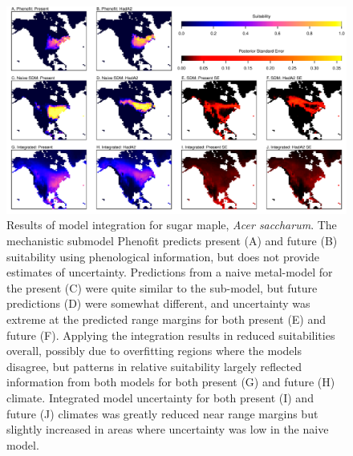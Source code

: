 \begin{figure}[tb]
	\includegraphics[width=6in]{ex2.pdf}
	\caption{Results of model integration for sugar maple, \emph{Acer saccharum}.
	The mechanistic submodel Phenofit predicts present (A) and future (B) suitability using phenological information, but does not provide estimates of uncertainty.
	Predictions from a naive metal-model for the present (C) were quite similar to the sub-model, but future predictions (D) were somewhat different, and uncertainty was extreme at the predicted range margins for both present (E) and future (F).
	Applying the integration results in reduced suitabilities overall, possibly due to overfitting regions where the models disagree, but patterns in relative suitability largely reflected information from both models for both present (G) and future (H) climate.
	Integrated model uncertainty for both present (I) and future (J) climates was greatly reduced near range margins but slightly increased in areas where uncertainty was low in the naive model.
	}
	\label{fig:ex2}
\end{figure}
%

